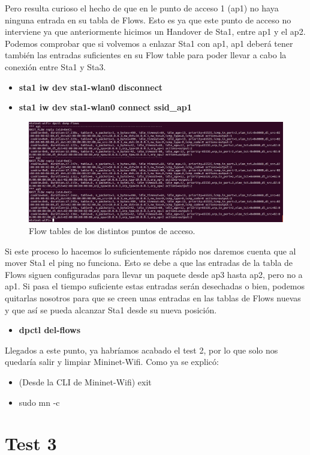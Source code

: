 Pero resulta curioso el hecho de que en le punto de acceso 1 (ap1) no haya ninguna entrada en su tabla de Flows. Esto es ya que este punto de acceso no interviene ya que anteriormente hicimos un Handover de Sta1, entre ap1 y el ap2. Podemos comprobar que si volvemos a enlazar Sta1 con ap1, ap1 deberá tener también las entradas suficientes en su Flow table para poder llevar a cabo la conexión entre Sta1 y Sta3. 
\begin{itemize}
    \item \textbf{sta1 iw dev sta1-wlan0 disconnect} 
    \item \textbf{sta1 iw dev sta1-wlan0 connect ssid\_ap1}
\end{itemize}
\begin{figure}[!htb]
  \centering
    \includegraphics[width=0.9\linewidth]{./img/18.JPG}
    \caption{Flow tables de los distintos puntos de acceso.}
  \label{fig:yo}
\end{figure}
\newpage
Si este proceso lo hacemos lo suficientemente rápido nos daremos cuenta que al mover Sta1 el ping no funciona. Esto se debe a que las entradas de la tabla de Flows siguen configuradas para llevar un paquete desde ap3 hasta ap2, pero no a ap1. Si pasa el tiempo suficiente estas entradas serán desechadas o bien, podemos quitarlas nosotros para que se creen unas entradas en las tablas de Flows nuevas y que así se pueda alcanzar Sta1 desde su nueva posición.
\begin{itemize}
    \item \textbf{dpctl del-flows}
\end{itemize}
Llegados a este punto, ya habríamos acabado el test 2, por lo que solo nos quedaría salir y limpiar Mininet-Wifi. Como ya se explicó:

\begin{itemize}
    \item (Desde la CLI de Mininet-Wifi) exit
    \item  sudo mn -c
\end{itemize}
\newpage
\section{Test 3}


